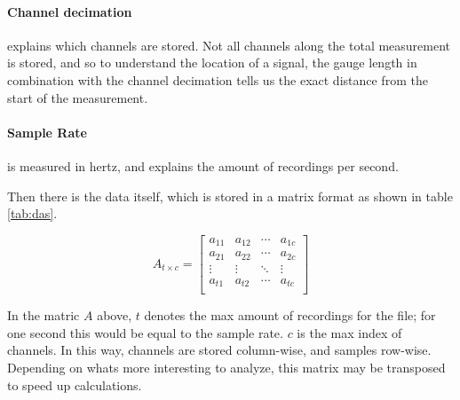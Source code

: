 \paragraph{Channel decimation} explains which channels are stored. Not all channels along the total measurement is stored, and so to understand the location of a signal, the gauge length in combination with the channel decimation tells us the exact distance from the start of the measurement.

\paragraph{Sample Rate} is measured in hertz, and explains the amount of recordings per second.

Then there is the data itself, which is stored in a matrix format as shown in table \ref{tab:das}.

\[
  A_{t\times c} =
  \left[ {\begin{array}{cccc}
    a_{11} & a_{12} & \cdots & a_{1c}\\
    a_{21} & a_{22} & \cdots & a_{2c}\\
    \vdots & \vdots & \ddots & \vdots\\
    a_{t1} & a_{t2} & \cdots & a_{tc}\\
  \end{array} } \right]
\]

In the matric $A$ above, $t$ denotes the max amount of recordings for the file; for one second this would be equal to the sample rate. $c$ is the max index of channels. In this way, channels are stored column-wise, and samples row-wise. Depending on whats more interesting to analyze, this matrix may be transposed to speed up calculations.